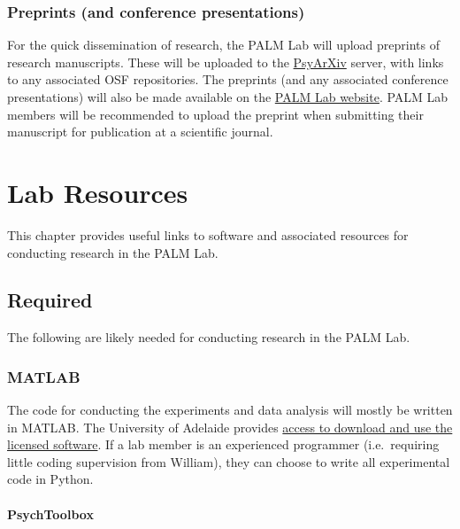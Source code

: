 \documentclass[
]{book}
\begin{document}
\hypertarget{preprints-and-conference-presentations}{%
\subsection{Preprints (and conference presentations)}\label{preprints-and-conference-presentations}}

For the quick dissemination of research, the PALM Lab will upload preprints of research manuscripts. These will be uploaded to the \href{https://psyarxiv.com}{PsyArXiv} server, with links to any associated OSF repositories. The preprints (and any associated conference presentations) will also be made available on the \href{https://palm-lab.github.io/presentations}{PALM Lab website}. PALM Lab members will be recommended to upload the preprint when submitting their manuscript for publication at a scientific journal.

\hypertarget{lab-resources}{%
\chapter{Lab Resources}\label{lab-resources}}

This chapter provides useful links to software and associated resources for conducting research in the PALM Lab.

\hypertarget{required}{%
\section{Required}\label{required}}

The following are likely needed for conducting research in the PALM Lab.

\hypertarget{matlab}{%
\subsection*{MATLAB}\label{matlab}}

The code for conducting the experiments and data analysis will mostly be written in MATLAB. The University of Adelaide provides \href{https://www.mathworks.com/academia/tah-portal/university-of-adelaide-30536634.html}{access to download and use the licensed software}. If a lab member is an experienced programmer (i.e.~requiring little coding supervision from William), they can choose to write all experimental code in Python.

\hypertarget{psychtoolbox}{%
\subsubsection*{PsychToolbox}\label{psychtoolbox}}
\end{document}
